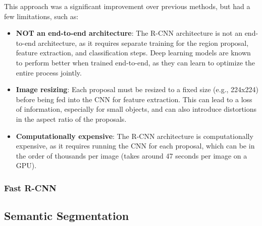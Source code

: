 This approach was a significant improvement over previous methods, but had a few limitations, such as:
\begin{itemize}
    \item \textbf{NOT an end-to-end architecture}: The R-CNN architecture is not an end-to-end architecture, as it requires separate training for the region proposal, feature extraction, and classification steps.
    Deep learning models are known to perform better when trained end-to-end, as they can learn to optimize the entire process jointly.
    \item \textbf{Image resizing}: Each proposal must be resized to a fixed size (e.g., 224x224) before being fed into the CNN for feature extraction.
    This can lead to a loss of information, especially for small objects, and can also introduce distortions in the aspect ratio of the proposals.
    \item \textbf{Computationally expensive}: The R-CNN architecture is computationally expensive, as it requires running the CNN for each proposal, 
    which can be in the order of thousands per image (takes around 47 seconds per image on a GPU).
\end{itemize}

\subsubsection{Fast R-CNN}
\subsection{Semantic Segmentation}